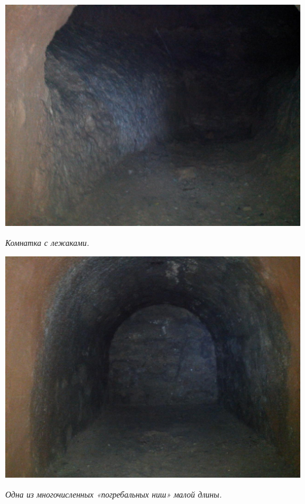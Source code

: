 \vspace*{\fill}

\begin{center}
\includegraphics[width=0.98\linewidth]{chast-colebanie-osnov/nachalo/IMG_20170626_135030.jpg}

\textit{Комнатка с лежаками.}
\end{center}

\vspace*{\fill}


\newpage

\begin{center}
\includegraphics[width=0.98\linewidth]{chast-colebanie-osnov/nachalo/IMG_20170626_135106.jpg}

\textit{Одна из многочисленных «погребальных ниш» малой длины.}
\end{center}

